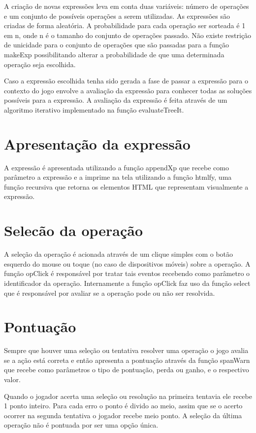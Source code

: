 A criação de novas expressões leva em conta duas variáveis: número de operações e um conjunto de possíveis operações a serem utilizadas. As expressões são criadas de forma aleatória. A probabilidade para cada operação ser sorteada é 1 em n, onde n é o tamanho do conjunto de operações passado. 	Não existe restrição de unicidade para o conjunto de operações que são passadas para a função makeExp possibilitando alterar a probabilidade de que uma determinada operação seja escolhida.

Caso a expressão escolhida tenha sido gerada a fase de passar a expressão para o contexto do jogo envolve a avaliação da expressão para conhecer todas as soluções possíveis para a expressão. A avaliação da expressão é feita através de um algoritmo iterativo implementado na função evaluateTreeIt.

\section{Apresentação da expressão}
A expressão é apresentada utilizando a função appendXp que recebe como parâmetro a expressão e a imprime na tela utilizando a função htmlfy, uma função recursiva que retorna os elementos HTML que representam visualmente a expressão.

\section{Selecão da operação}
A seleção da operação é acionada através de um clique simples com o botão esquerdo do mouse ou toque (no caso de dispositivos móveis) sobre a operação. A função opClick é responsável por tratar tais eventos recebendo como parâmetro o identificador da operação. Internamente a função opClick faz uso da função select que é responsável por avaliar se a operação pode ou não ser resolvida.

\section{Pontuação}
Sempre que houver uma seleção ou tentativa resolver uma operação o jogo avalia se a ação está correta e então apresenta a pontuação através da função spanWarn que recebe como parâmetros o tipo de pontuação, perda ou ganho, e o respectivo valor.

Quando o jogador acerta uma seleção ou resolução na primeira tentavia ele recebe 1 ponto inteiro. Para cada erro o ponto é divido ao meio, assim que se o acerto ocorrer na segunda tentativa o jogador recebe meio ponto. A seleção da última operação não é pontuada por ser uma opção única.

